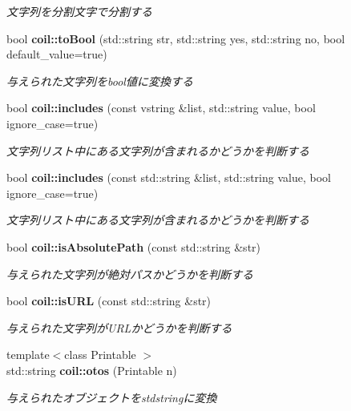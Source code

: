 \begin{DoxyCompactItemize}
\begin{DoxyCompactList}\small\item\em 文字列を分割文字で分割する \item\end{DoxyCompactList}\item 
bool {\bf coil::toBool} (std::string str, std::string yes, std::string no, bool default\_\-value=true)
\begin{DoxyCompactList}\small\item\em 与えられた文字列をbool値に変換する \item\end{DoxyCompactList}\item 
bool {\bf coil::includes} (const vstring \&list, std::string value, bool ignore\_\-case=true)
\begin{DoxyCompactList}\small\item\em 文字列リスト中にある文字列が含まれるかどうかを判断する \item\end{DoxyCompactList}\item 
bool {\bf coil::includes} (const std::string \&list, std::string value, bool ignore\_\-case=true)
\begin{DoxyCompactList}\small\item\em 文字列リスト中にある文字列が含まれるかどうかを判断する \item\end{DoxyCompactList}\item 
bool {\bf coil::isAbsolutePath} (const std::string \&str)
\begin{DoxyCompactList}\small\item\em 与えられた文字列が絶対パスかどうかを判断する \item\end{DoxyCompactList}\item 
bool {\bf coil::isURL} (const std::string \&str)
\begin{DoxyCompactList}\small\item\em 与えられた文字列がURLかどうかを判断する \item\end{DoxyCompactList}\item 
{\footnotesize template$<$class Printable $>$ }\\std::string {\bf coil::otos} (Printable n)
\begin{DoxyCompactList}\small\item\em 与えられたオブジェクトをstdstringに変換 \item\end{DoxyCompactList}\item 

\end{DoxyCompactItemize}
